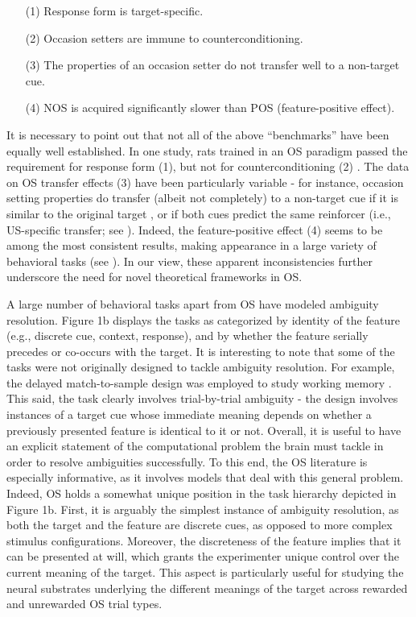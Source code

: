 \documentclass[11pt]{article}
\let\cite=\citep
\let\citeNP=\citealt
\begin{document}
\begin{enumerate}
   \item[(1)] Response form is target-specific.
   \item[(2)] Occasion setters are immune to counterconditioning.
   \item[(3)] The properties of an occasion setter do not transfer well to a 
   non-target cue.
   \item[(4)] NOS is acquired significantly slower than POS (feature-positive 
   effect).
\end{enumerate}

It is necessary to point out that not all of the above ``benchmarks'' have been 
equally well established. In one study, rats trained in an OS paradigm passed 
the requirement for response form (1), but not for counterconditioning (2) 
\cite{Moreira2003a}. The data on OS transfer effects (3) have been particularly 
variable - for instance, occasion setting properties do transfer (albeit not 
completely) to a non-target cue if it is similar to the original target 
\cite{Swartzentruber1995}, or if both cues predict the same reinforcer (i.e., 
US-specific transfer; see \citeNP{Bonardi2012,Bonardi2017}). Indeed, the 
feature-positive effect (4) seems to be among the most consistent results, 
making appearance in a large variety of behavioral tasks (see 
\citeNP{Jenkins1970,Bouton2011,Bouton2012,Holland1999}). In our view, these 
apparent inconsistencies further underscore the need for novel theoretical 
frameworks in OS. 

A large number of behavioral tasks apart from OS have modeled ambiguity 
resolution. Figure 1b displays the tasks as categorized by identity of the 
feature (e.g., discrete cue, context, response), and by whether the feature 
serially precedes or co-occurs with the target. It is interesting to note that 
some of the tasks were not originally designed to tackle ambiguity resolution. 
For example, the delayed match-to-sample design was employed to study working 
memory \cite{Miller1996}. This said, the task clearly involves trial-by-trial 
ambiguity - the design involves instances of a target cue whose immediate 
meaning depends on whether a previously presented feature is identical to it or 
not. Overall, it is useful to have an explicit statement of the computational 
problem the brain must tackle in order to resolve ambiguities successfully. To 
this end, the OS literature is especially informative, as it involves models 
that deal with this general problem. Indeed, OS holds a somewhat unique 
position in the task hierarchy depicted in Figure 1b. First, it is arguably the 
simplest instance of ambiguity resolution, as both the target and the feature 
are discrete cues, as opposed to more complex stimulus configurations. 
Moreover, the discreteness of the feature implies that it can be presented at 
will, which grants the experimenter unique control over the current meaning of 
the target. This aspect is particularly useful for studying the neural 
substrates underlying the different meanings of the target across rewarded and 
unrewarded OS trial types.
\end{document}
